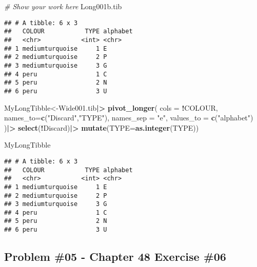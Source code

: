 \documentclass[
]{article}
\newenvironment{Shaded}{\begin{snugshade}}{\end{snugshade}}
\newcommand{\AttributeTok}[1]{\textcolor[rgb]{0.13,0.29,0.53}{#1}}
\newcommand{\CommentTok}[1]{\textcolor[rgb]{0.56,0.35,0.01}{\textit{#1}}}
\newcommand{\FunctionTok}[1]{\textcolor[rgb]{0.13,0.29,0.53}{\textbf{#1}}}
\newcommand{\NormalTok}[1]{#1}
\newcommand{\OtherTok}[1]{\textcolor[rgb]{0.56,0.35,0.01}{#1}}
\newcommand{\SpecialCharTok}[1]{\textcolor[rgb]{0.81,0.36,0.00}{\textbf{#1}}}
\newcommand{\StringTok}[1]{\textcolor[rgb]{0.31,0.60,0.02}{#1}}
\begin{document}
\begin{Shaded}
\begin{Highlighting}[]
\CommentTok{\# Show your work here}
\NormalTok{Long001b.tib}
\end{Highlighting}
\end{Shaded}

\begin{verbatim}
## # A tibble: 6 x 3
##   COLOUR           TYPE alphabet
##   <chr>           <int> <chr>   
## 1 mediumturquoise     1 E       
## 2 mediumturquoise     2 P       
## 3 mediumturquoise     3 G       
## 4 peru                1 C       
## 5 peru                2 N       
## 6 peru                3 U
\end{verbatim}

\begin{Shaded}
\begin{Highlighting}[]
\NormalTok{MyLongTibble}\OtherTok{\textless{}{-}}\NormalTok{Wide001.tib}\SpecialCharTok{|\textgreater{}}
  \FunctionTok{pivot\_longer}\NormalTok{(}
    \AttributeTok{cols =} \SpecialCharTok{!}\NormalTok{COLOUR,}
    \AttributeTok{names\_to=}\FunctionTok{c}\NormalTok{(}\StringTok{"Discard"}\NormalTok{,}\StringTok{"TYPE"}\NormalTok{),}
    \AttributeTok{names\_sep =} \StringTok{"e"}\NormalTok{,}
    \AttributeTok{values\_to =} \FunctionTok{c}\NormalTok{(}\StringTok{"alphabet"}\NormalTok{)}
\NormalTok{  )}\SpecialCharTok{|\textgreater{}}
  \FunctionTok{select}\NormalTok{(}\SpecialCharTok{!}\NormalTok{Discard)}\SpecialCharTok{|\textgreater{}}
  \FunctionTok{mutate}\NormalTok{(}\AttributeTok{TYPE=}\FunctionTok{as.integer}\NormalTok{(TYPE))}

\NormalTok{MyLongTibble}
\end{Highlighting}
\end{Shaded}

\begin{verbatim}
## # A tibble: 6 x 3
##   COLOUR           TYPE alphabet
##   <chr>           <int> <chr>   
## 1 mediumturquoise     1 E       
## 2 mediumturquoise     2 P       
## 3 mediumturquoise     3 G       
## 4 peru                1 C       
## 5 peru                2 N       
## 6 peru                3 U
\end{verbatim}

\newpage

\hypertarget{problem-05---chapter-48-exercise-06}{%
\subsection{Problem \#05 - Chapter 48 Exercise
\#06}\label{problem-05---chapter-48-exercise-06}}
\end{document}
